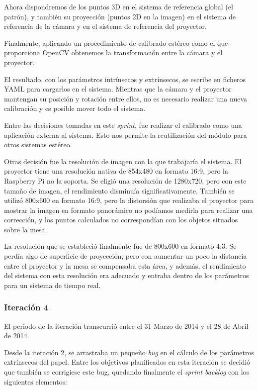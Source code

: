 Ahora dispondremos de los puntos 3D en el sistema de referencia global (el patrón), y también su proyección (puntos 2D en la imagen) en el sistema de referencia de la cámara y en el sistema de referencia del proyector. 

Finalmente, aplicando un procedimiento de calibrado estéreo como el que proporciona OpenCV obtenemos la transformación entre la cámara y el proyector.

El resultado, con los parámetros intrínsecos y extrínsecos, se escribe en ficheros YAML para cargarlos en el sistema. Mientras que la cámara y el proyector mantengan su posición y rotación entre ellos, no es necesario realizar una nueva calibración y es posible mover todo el sistema.  

Entre las decisiones tomadas en este \textit{sprint}, fue realizar el calibrado como una aplicación externa al sistema. Esto nos permite la reutilización del módulo para otros sistemas estéreo.

Otras decisión fue la resolución de imagen con la que trabajaría el sistema. El proyector tiene una resolución nativa de 854x480 en formato 16:9, pero la Raspberry Pi no la soporta. Se eligió una resolución de 1280x720, pero con este tamaño de imagen, el rendimiento disminuía significativamente. También se utilizó 800x600 en formato 16:9, pero la distorsión que realizaba el proyector para mostrar la imagen en formato panorámico no podíamos medirla para realizar una corrección, y los puntos calculados no correspondían con los objetos situados sobre la mesa.

La resolución que se estableció finalmente fue de 800x600 en formato 4:3. Se perdía algo de superficie de proyección, pero con aumentar un poco la distancia entre el proyector y la mesa se compensaba esta área, y además, el rendimiento del sistema con esta resolución era adecuado y entraba dentro de los parámetros para un sistema de tiempo real.

\subsubsection{Iteración 4}
El periodo de la iteración transcurrió entre el 31 Marzo de 2014 y el 28 de Abril de 2014. 

Desde la iteración 2, se arrastraba un pequeño \textit{bug} en el cálculo de los parámetros extrínsecos del papel. Entre los objetivos planificados en esta iteración se decidió que también se corrigiese este bug, quedando finalmente el \textit{sprint backlog} con los siguientes elementos:

